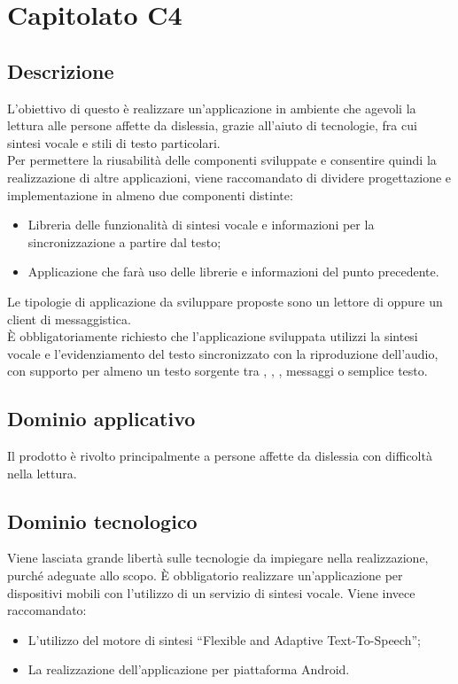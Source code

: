 \documentclass[../StudioDiFattibilita.tex]{subfiles}
\begin{document}
	\section{Capitolato C4}
		\subsection{Descrizione}
			L'obiettivo di questo  è realizzare un'applicazione in ambiente  che agevoli la
			lettura alle persone affette da dislessia, grazie all'aiuto di tecnologie, fra cui
			sintesi vocale e stili di testo particolari.\\
			Per permettere la riusabilità delle componenti sviluppate e consentire quindi la realizzazione di
			altre applicazioni, viene raccomandato di dividere progettazione e implementazione in almeno due
			componenti distinte:
			\begin{itemize}
				\item Libreria delle funzionalità di sintesi vocale e informazioni per la sincronizzazione a
				partire dal testo;
				\item Applicazione che farà uso delle librerie e informazioni del punto precedente.
			\end{itemize}
			Le tipologie di applicazione da sviluppare proposte sono un lettore di  oppure un
			client di messaggistica.\\
			È obbligatoriamente richiesto che l'applicazione sviluppata utilizzi la sintesi vocale e
			l'evidenziamento del testo sincronizzato con la riproduzione dell'audio, con supporto per almeno un
			testo sorgente tra , , , messaggi o semplice testo.
		\subsection{Dominio applicativo}
			Il prodotto è rivolto principalmente a persone affette da dislessia con difficoltà nella lettura.
		\subsection{Dominio tecnologico}
			Viene lasciata grande libertà sulle tecnologie da impiegare nella realizzazione, purché adeguate allo
			scopo. È obbligatorio realizzare un'applicazione per dispositivi mobili con l'utilizzo di un servizio
			di sintesi vocale. Viene invece raccomandato:
			\begin{itemize}
				\item L'utilizzo del motore di sintesi ``Flexible and Adaptive Text-To-Speech'';
				\item La realizzazione dell'applicazione per piattaforma Android.
			\end{itemize}
\end{document}
